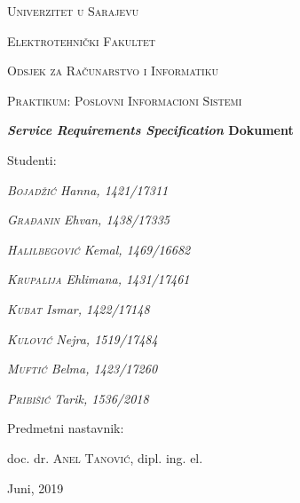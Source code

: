 \begin{titlepage}
	\centering
	{\scshape Univerzitet u Sarajevu \par}
	{\scshape Elektrotehnički Fakultet \par}
	{\scshape Odsjek za Računarstvo i Informatiku \par}
	\vspace{2cm}
	{\Large\scshape Praktikum: Poslovni Informacioni Sistemi\par}
	\vspace{2.5cm}
	{\huge\bfseries \textit{Service Requirements Specification} Dokument\par}
	\vspace{2.5cm}
	\Large Studenti: \par
	{\Large\itshape \textsc{Bojadžić} Hanna, 1421/17311\par}
	{\Large\itshape \textsc{Građanin} Ehvan, 1438/17335\par}
	{\Large\itshape \textsc{Halilbegović} Kemal, 1469/16682\par}
	{\Large\itshape \textsc{Krupalija} Ehlimana, 1431/17461\par}
	{\Large\itshape \textsc{Kubat} Ismar, 1422/17148\par}
	{\Large\itshape \textsc{Kulović} Nejra, 1519/17484\par}
	{\Large\itshape \textsc{Muftić} Belma, 1423/17260\par}
	{\Large\itshape \textsc{Pribišić} Tarik, 1536/2018\par}
	\vfill
	Predmetni nastavnik:\par
	doc. dr. \textsc{Anel Tanović}, dipl. ing. el.
	\vfill
	{\large Juni, 2019\par}
\end{titlepage}

